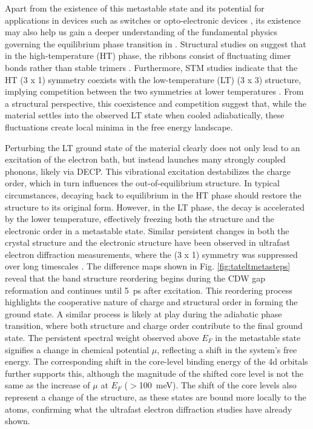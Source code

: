Apart from the existence of this metastable state and its potential for applications in devices such as switches or opto-electronic devices \cite{bao_light-induced_2022, schaibley_valleytronics_2016, tokura_emergent_2017, konstantatos_current_2018, liu_semimetals_2020, du_engineering_2021}, its existence may also help us gain a deeper understanding of the fundamental physics governing the equilibrium phase transition in .
Structural studies on  suggest that in the high-temperature (HT) phase, the ribbons consist of fluctuating dimer bonds rather than stable  trimers \cite{katayama_observation_2023}.
Furthermore, STM studies indicate that the HT (3 x 1) symmetry coexists with the low-temperature (LT) (3 x 3) structure, implying competition between the two symmetries at lower temperatures \cite{feng_charge_2016}.
From a structural perspective, this coexistence and competition suggest that, while the material settles into the observed LT state when cooled adiabatically, these fluctuations create local minima in the free energy landscape.

Perturbing the LT ground state of the material clearly does not only lead to an excitation of the electron bath, but instead launches many strongly coupled phonons, likely via DECP. This vibrational excitation destabilizes the charge order, which in turn influences the out-of-equilibrium structure.
In typical circumstances, decaying back to equilibrium in the HT phase should restore the structure to its original form.
However, in the LT phase, the decay is accelerated by the lower temperature, effectively freezing both the structure and the electronic order in a metastable state.
Similar persistent changes in both the crystal structure and the electronic structure have been observed in ultrafast electron diffraction measurements, where the (3 x 1) symmetry was suppressed over long timescales \cite{siddiqui_ultrafast_2021, domrose_femtosecond_2024}.
The difference maps shown in Fig. \ref{fig:tateltmetasteps} reveal that the band structure reordering begins during the CDW gap reformation and continues until \qty{5}{\pico\second} after excitation.
This reordering process highlights the cooperative nature of charge and structural order in forming the ground state.
A similar process is likely at play during the adiabatic phase transition, where both structure and charge order contribute to the final ground state.
The persistent spectral weight observed above $E_F$ in the metastable state signifies a change in chemical potential $\mu$, reflecting a shift in the system’s free energy.
The corresponding shift in the core-level binding energy of the  4d orbitals further supports this, although the magnitude of the shifted core level is not the same as the increase of $\mu$ at $E_F$ ($>$\qty{100}{\milli\electronvolt}).
The shift of the core levels also represent a change of the structure, as these states are bound more locally to the  atoms, confirming what the ultrafast electron diffraction studies have already shown.

